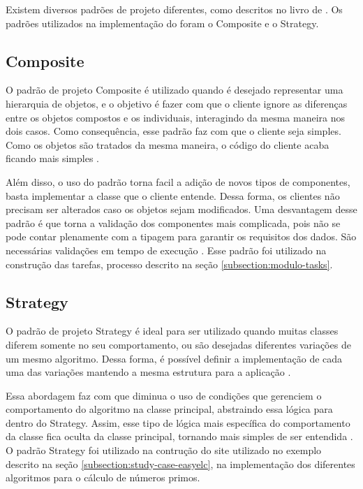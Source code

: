 \documentclass[12pt]{tcc}
\begin{document}
	Existem diversos padrões de projeto diferentes, como descritos no livro de \cite{gamma1994design}. Os padrões utilizados na implementação do  foram o Composite e o Strategy.

	\subsection{Composite}
	\label{subsection:composite}

	O padrão de projeto Composite é utilizado quando é desejado representar uma hierarquia de objetos, e o objetivo é fazer com que o cliente ignore as diferenças entre os objetos compostos e os individuais, interagindo da mesma maneira nos dois casos. Como consequência, esse padrão faz com que o cliente seja simples. Como os objetos são tratados da mesma maneira, o código do cliente acaba ficando mais simples \citep[Capítulo 4]{gamma1994design}.
	
	Além disso, o uso do padrão torna facil a adição de novos tipos de componentes, basta implementar a classe que o cliente entende. Dessa forma, os clientes não precisam ser alterados caso os objetos sejam modificados. Uma desvantagem desse padrão é que torna a validação dos componentes mais complicada, pois não se pode contar plenamente com a tipagem para garantir os requisitos dos dados. São necessárias validações em tempo de execução \citep[Capítulo 4]{gamma1994design}. Esse padrão foi utilizado na construção das tarefas, processo descrito na seção \ref{subsection:modulo-tasks}.

	\subsection{Strategy}
	\label{subsection:strategy}

	O padrão de projeto Strategy é ideal para ser utilizado quando muitas classes diferem somente no seu comportamento, ou são desejadas diferentes variações de um mesmo algoritmo. Dessa forma, é possível definir a implementação de cada uma das variações mantendo a mesma estrutura para a aplicação \citep{gamma1994design}. 

	Essa abordagem faz com que diminua o uso de condições que gerenciem o comportamento do algoritmo na classe principal, abstraindo essa lógica para dentro do Strategy. Assim, esse tipo de lógica mais específica do comportamento da classe fica oculta da classe principal, tornando mais simples de ser entendida  \citep{gamma1994design}. O padrão Strategy foi utilizado na contrução do site utilizado no exemplo descrito na seção \ref{subsection:study-case-easyelc}, na implementação dos diferentes algoritmos para o cálculo de números primos.
\end{document}
